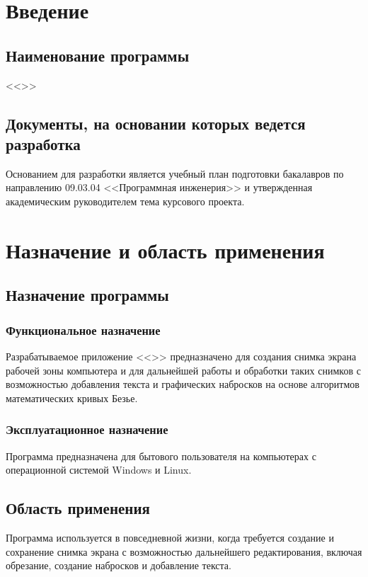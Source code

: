 \documentclass[a4paper,12pt]{article}
\begin{document}
  \CRTpreamble

  \section{Введение}
  \subsection{Наименование программы}
  <<\CRTname>>

  \subsection{Документы, на основании которых ведется разработка}
  Основанием для разработки является учебный план подготовки бакалавров по направлению 09.03.04 <<Программная инженерия>> и утвержденная академическим руководителем тема курсового проекта.

  \newpage
  \section{Назначение и область применения}
  \subsection{Назначение программы}
  \subsubsection{Функциональное назначение}
  Разрабатываемое приложение <<\CRTname>> предназначено для создания снимка экрана рабочей зоны компьютера и для дальнейшей работы и обработки таких снимков с возможностью добавления текста и графических набросков на основе алгоритмов математических кривых Безье.
  \subsubsection{Эксплуатационное назначение}
  Программа предназначена для бытового пользователя на компьютерах с операционной системой Windows и Linux.
  \subsection{Область применения}
  Программа используется в повседневной жизни, когда требуется создание и сохранение снимка экрана с возможностью дальнейшего редактирования, включая обрезание, создание набросков и добавление текста.
\end{document}
